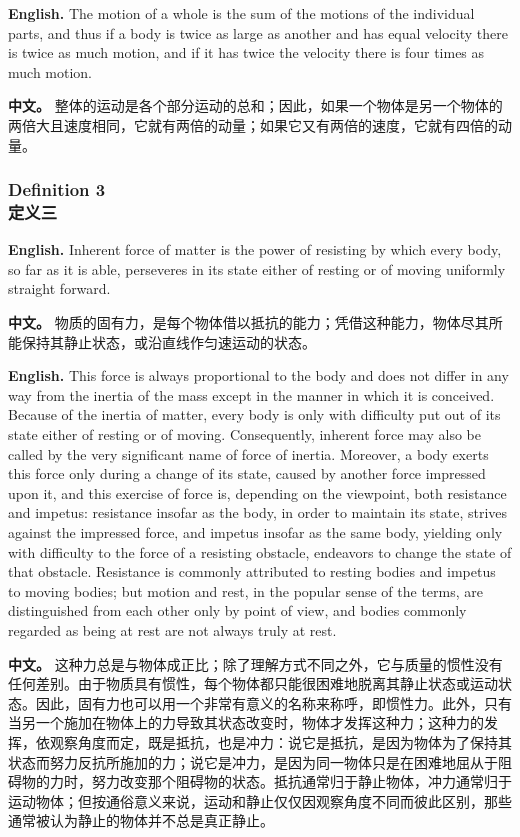\noindent\textbf{English.} The motion of a whole is the sum of the motions of the individual parts, and thus if a body is twice as large as another and has equal velocity there is twice as much motion, and if it has twice the velocity there is four times as much motion.
\par\noindent\textbf{中文。} 整体的运动是各个部分运动的总和；因此，如果一个物体是另一个物体的两倍大且速度相同，它就有两倍的动量；如果它又有两倍的速度，它就有四倍的动量。
\medskip

\subsubsection*{Definition 3\\定义三}
\noindent\textbf{English.} Inherent force of matter is the power of resisting by which every body, so far as it is able, perseveres in its state either of resting or of moving uniformly straight forward.
\par\noindent\textbf{中文。} 物质的固有力，是每个物体借以抵抗的能力；凭借这种能力，物体尽其所能保持其静止状态，或沿直线作匀速运动的状态。
\medskip

\noindent\textbf{English.} This force is always proportional to the body and does not differ in any way from the inertia of the mass except in the manner in which it is conceived. Because of the inertia of matter, every body is only with difficulty put out of its state either of resting or of moving. Consequently, inherent force may also be called by the very significant name of force of inertia. Moreover, a body exerts this force only during a change of its state, caused by another force impressed upon it, and this exercise of force is, depending on the viewpoint, both resistance and impetus: resistance insofar as the body, in order to maintain its state, strives against the impressed force, and impetus insofar as the same body, yielding only with difficulty to the force of a resisting obstacle, endeavors to change the state of that obstacle. Resistance is commonly attributed to resting bodies and impetus to moving bodies; but motion and rest, in the popular sense of the terms, are distinguished from each other only by point of view, and bodies commonly regarded as being at rest are not always truly at rest.
\par\noindent\textbf{中文。} 这种力总是与物体成正比；除了理解方式不同之外，它与质量的惯性没有任何差别。由于物质具有惯性，每个物体都只能很困难地脱离其静止状态或运动状态。因此，固有力也可以用一个非常有意义的名称来称呼，即惯性力。此外，只有当另一个施加在物体上的力导致其状态改变时，物体才发挥这种力；这种力的发挥，依观察角度而定，既是抵抗，也是冲力：说它是抵抗，是因为物体为了保持其状态而努力反抗所施加的力；说它是冲力，是因为同一物体只是在困难地屈从于阻碍物的力时，努力改变那个阻碍物的状态。抵抗通常归于静止物体，冲力通常归于运动物体；但按通俗意义来说，运动和静止仅仅因观察角度不同而彼此区别，那些通常被认为静止的物体并不总是真正静止。
\medskip


